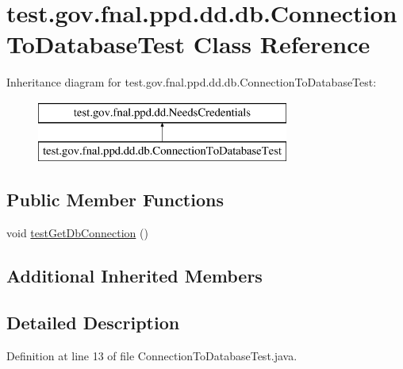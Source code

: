 \hypertarget{classtest_1_1gov_1_1fnal_1_1ppd_1_1dd_1_1db_1_1ConnectionToDatabaseTest}{\section{test.\-gov.\-fnal.\-ppd.\-dd.\-db.\-Connection\-To\-Database\-Test Class Reference}
\label{classtest_1_1gov_1_1fnal_1_1ppd_1_1dd_1_1db_1_1ConnectionToDatabaseTest}
}
Inheritance diagram for test.\-gov.\-fnal.\-ppd.\-dd.\-db.\-Connection\-To\-Database\-Test\-:\begin{figure}[H]
\begin{center}
\leavevmode
\includegraphics[height=2.000000cm]{classtest_1_1gov_1_1fnal_1_1ppd_1_1dd_1_1db_1_1ConnectionToDatabaseTest}
\end{center}
\end{figure}
\subsection*{Public Member Functions}
\begin{DoxyCompactItemize}
\item 
void \hyperlink{classtest_1_1gov_1_1fnal_1_1ppd_1_1dd_1_1db_1_1ConnectionToDatabaseTest_a9b14423e963aaf1d50a2ee8db6534c78}{test\-Get\-Db\-Connection} ()
\end{DoxyCompactItemize}
\subsection*{Additional Inherited Members}


\subsection{Detailed Description}


Definition at line 13 of file Connection\-To\-Database\-Test.\-java.



